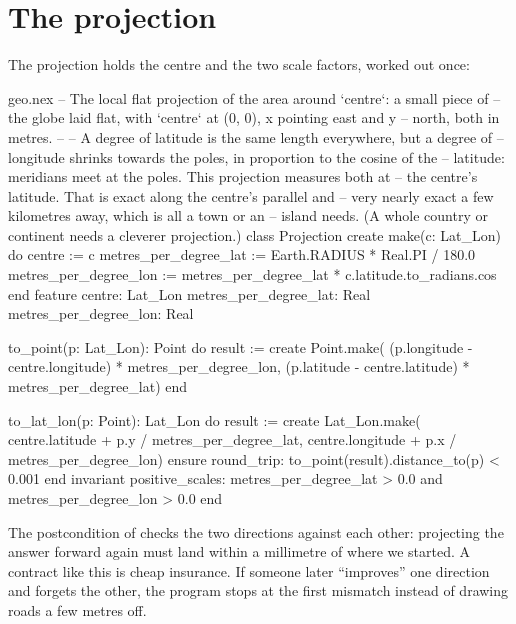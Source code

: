 \section{The projection}

The projection holds the centre and the two scale factors, worked out once:

\begin{append}{geo.nex}
-- The local flat projection of the area around `centre`: a small piece of
-- the globe laid flat, with `centre` at (0, 0), x pointing east and y
-- north, both in metres.
--
-- A degree of latitude is the same length everywhere, but a degree of
-- longitude shrinks towards the poles, in proportion to the cosine of the
-- latitude: meridians meet at the poles. This projection measures both at
-- the centre's latitude. That is exact along the centre's parallel and
-- very nearly exact a few kilometres away, which is all a town or an
-- island needs. (A whole country or continent needs a cleverer projection.)
class Projection
create
  make(c: Lat_Lon) do
    centre := c
    metres_per_degree_lat := Earth.RADIUS * Real.PI / 180.0
    metres_per_degree_lon := metres_per_degree_lat * c.latitude.to_radians.cos
  end
feature
  centre: Lat_Lon
  metres_per_degree_lat: Real
  metres_per_degree_lon: Real

  to_point(p: Lat_Lon): Point do
    result := create Point.make(
      (p.longitude - centre.longitude) * metres_per_degree_lon,
      (p.latitude - centre.latitude) * metres_per_degree_lat)
  end

  to_lat_lon(p: Point): Lat_Lon do
    result := create Lat_Lon.make(
      centre.latitude + p.y / metres_per_degree_lat,
      centre.longitude + p.x / metres_per_degree_lon)
  ensure
    round_trip: to_point(result).distance_to(p) < 0.001
  end
invariant
  positive_scales: metres_per_degree_lat > 0.0 and metres_per_degree_lon > 0.0
end
\end{append}

The postcondition of  checks the two directions against
each other: projecting the answer forward again must land within a
millimetre of where we started. A contract like this is cheap insurance.
If someone later ``improves'' one direction and forgets the other, the
program stops at the first mismatch instead of drawing roads a few metres
off.

